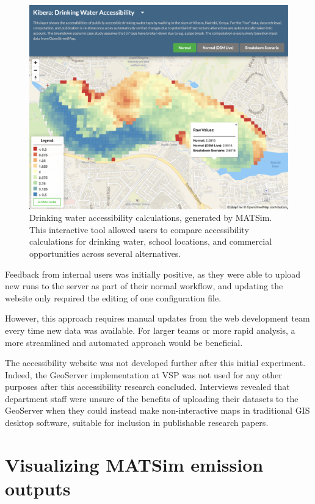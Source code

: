 \begin{figure}[!ht]
  \includegraphics[width=\textwidth]{chapters/12-server-experiments/images/nairobi.png}
  \caption[Drinking water accessibility calculations, generated by MATSim]{Drinking water accessibility calculations, generated by MATSim. This interactive tool allowed users to compare accessibility calculations for drinking water, school locations, and commercial opportunities across several alternatives.}
  \label{fig:nairobi}
\end{figure}

Feedback from internal users was initially positive, as they were able to upload new runs to the server as part of their normal workflow, and updating the website only required the editing of one configuration file.

However, this approach requires manual updates from the web development team every time new data was available. For larger teams or more rapid analysis, a more streamlined and automated approach would be beneficial.

The accessibility website was not developed further after this initial experiment. Indeed, the GeoServer implementation at VSP was not used for any other purposes after this accessibility research concluded. Interviews revealed that department staff were unsure of the benefits of uploading their datasets to the GeoServer when they could instead make non-interactive maps in traditional GIS desktop software, suitable for inclusion in publishable research papers.

\hypertarget{server-experiments-emissions}{%
\section{Visualizing MATSim emission outputs}
\label{server-experiments-emissions}}

